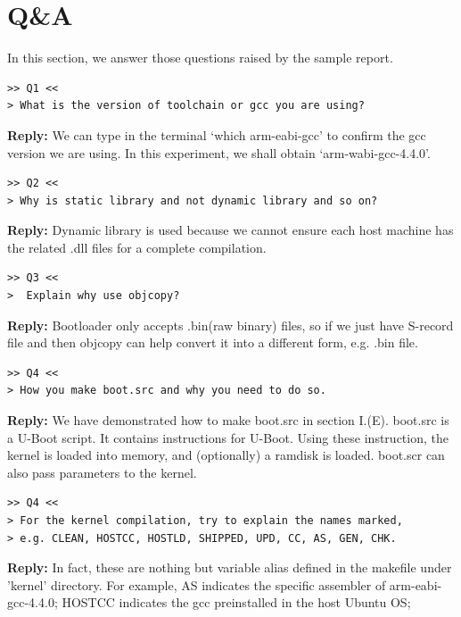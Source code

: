 \documentclass[12pt,journal,draftclsnofoot,onecolumn]{IEEEtran}
\begin{document}
\section{Q\&A}\label{QA}
In this section, we answer those questions raised by the sample report.

\begin{verbatim}
>> Q1 <<
> What is the version of toolchain or gcc you are using?
\end{verbatim}
\textbf{Reply:} We can type in the terminal `which arm-eabi-gcc' to confirm the gcc version we are 
using. In this experiment, we shall obtain `arm-wabi-gcc-4.4.0'.

\begin{verbatim}
>> Q2 <<
> Why is static library and not dynamic library and so on?
\end{verbatim}
\textbf{Reply:} Dynamic library is used because we cannot ensure each host machine has 
the related .dll files for a complete compilation. 

\begin{verbatim}
>> Q3 <<
>  Explain why use objcopy?
\end{verbatim}
\textbf{Reply:} Bootloader only accepts .bin(raw binary) files, so if we just have S-record file and then 
objcopy can help convert it into a different form, e.g. .bin file.

\begin{verbatim}
>> Q4 <<
> How you make boot.src and why you need to do so.
\end{verbatim}
\textbf{Reply:} We have demonstrated how to make boot.src in section I.(E). 
boot.src is a U-Boot script. It contains instructions for U-Boot. Using these instruction, the kernel is loaded into memory, and (optionally) a ramdisk is loaded. boot.scr can also pass parameters to the kernel.

\begin{verbatim}
>> Q4 <<
> For the kernel compilation, try to explain the names marked, 
> e.g. CLEAN, HOSTCC, HOSTLD, SHIPPED, UPD, CC, AS, GEN, CHK.
\end{verbatim}
\textbf{Reply:} In fact, these are nothing but variable alias defined in the makefile under 'kernel' directory.
For example, AS indicates the specific assembler of arm-eabi-gcc-4.4.0; HOSTCC indicates the gcc preinstalled
in the host Ubuntu OS; 


%
%
\clearpage
\end{document}
